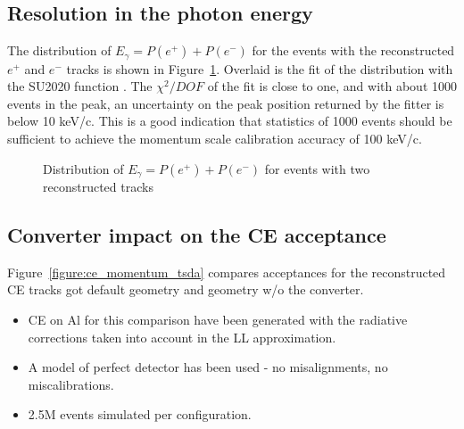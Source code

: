 \subsection{Resolution in the photon energy}

The distribution of $E_\gamma = P(e^+) + P(e^-)$ for the events with the reconstructed
$e^+$ and $e^-$ tracks is shown in Figure~\ref{figure:t2_0_smom_1}.
Overlaid is the fit of the distribution with the SU2020 function \cite{SU2020}.
The $\chi^2/DOF$ of the fit is close to one, and with about 1000 events in the peak,
an uncertainty on the peak position returned by the fitter is below 10 keV/c.
This is a good indication that statistics of 1000 events should be sufficient
to achieve the momentum scale calibration accuracy of 100 keV/c.

\begin{figure}[H]
  \caption{
    \label{figure:t2_0_smom_1}
    Distribution of $E_\gamma = P(e^+) + P(e^-)$ for events with two reconstructed tracks
  }
\end{figure}

\newpage
\subsection{Converter impact on the CE acceptance}

Figure~\ref{figure:ce_momentum_tsda} compares acceptances for the reconstructed CE tracks
got default geometry and geometry w/o the converter.
\begin{itemize}
\item 
  CE on Al for this comparison have been generated with the radiative corrections
  taken into account in the LL approximation.
\item 
  A model of perfect detector has been used - no misalignments, no miscalibrations.
\item
  2.5M events simulated per configuration.
\end{itemize}


